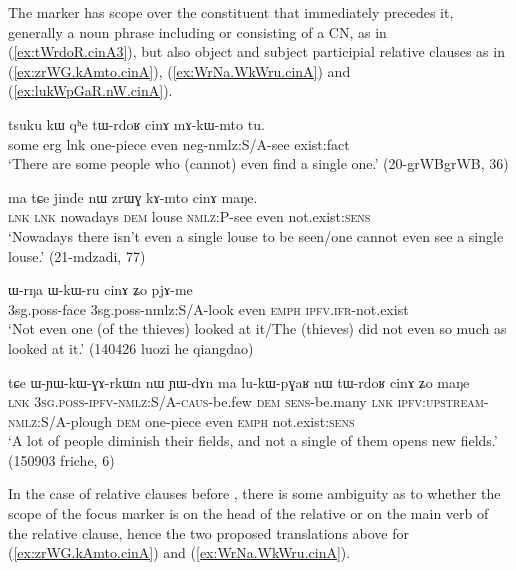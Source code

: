  The marker  has scope over the constituent that immediately precedes it, generally a noun phrase including or consisting of a CN, as in (\ref{ex:tWrdoR.cinA3}), but also object and subject participial relative clauses as in (\ref{ex:zrWG.kAmto.cinA}), (\ref{ex:WrNa.WkWru.cinA}) and (\ref{ex:lukWpGaR.nW.cinA}).
 
 \begin{exe}
\ex \label{ex:tWrdoR.cinA3}
\gll tsuku kɯ qʰe tɯ-rdoʁ cinɤ mɤ-kɯ-mto tu. \\
some erg lnk one-piece even neg-nmlz:S/A-see exist:fact \\
\glt `There are some people who (cannot) even find a single one.' (20-grWBgrWB, 36)
 \end{exe} 

 \begin{exe}
\ex \label{ex:zrWG.kAmto.cinA}
\gll  ma tɕe jinde nɯ zrɯɣ kɤ-mto cinɤ maŋe. \\
\textsc{lnk} \textsc{lnk} nowadays \textsc{dem} louse \textsc{nmlz:P}-see even not.exist:\textsc{sens} \\
\glt `Nowadays there isn't even a single louse to be seen/one cannot even see a single louse.' (21-mdzadi, 77)
\end{exe} 

\begin{exe}
\ex \label{ex:WrNa.WkWru.cinA}
\gll ɯ-rŋa ɯ-kɯ-ru cinɤ ʑo pjɤ-me \\
3sg.poss-face 3sg.poss-nmlz:S/A-look even \textsc{emph} \textsc{ipfv}.\textsc{ifr}-not.exist \\
\glt `Not even one (of the thieves) looked at it/The (thieves) did not even so much as looked at it.' (140426 luozi he qiangdao)
\end{exe}

\begin{exe}
\ex \label{ex:lukWpGaR.nW.cinA}
\gll tɕe ɯ-ɲɯ-kɯ-ɣɤ-rkɯn nɯ ɲɯ-dɤn ma lu-kɯ-pɣaʁ nɯ tɯ-rdoʁ cinɤ ʑo maŋe \\
\textsc{lnk} \textsc{3sg}.\textsc{poss}-\textsc{ipfv}-\textsc{nmlz}:S/A-\textsc{caus}-be.few \textsc{dem} \textsc{sens}-be.many \textsc{lnk} \textsc{ipfv}:\textsc{upstream}-\textsc{nmlz}:S/A-plough \textsc{dem} one-piece even \textsc{emph} not.exist:\textsc{sens} \\
\glt `A lot of people diminish their fields, and not a single of them opens new fields.' (150903 friche, 6)
\end{exe}

In the case of relative clauses before , there is some ambiguity as to whether the scope of the focus marker is on the head of the relative or on the main verb of the relative clause, hence the two proposed translations above for (\ref{ex:zrWG.kAmto.cinA}) and (\ref{ex:WrNa.WkWru.cinA}).

